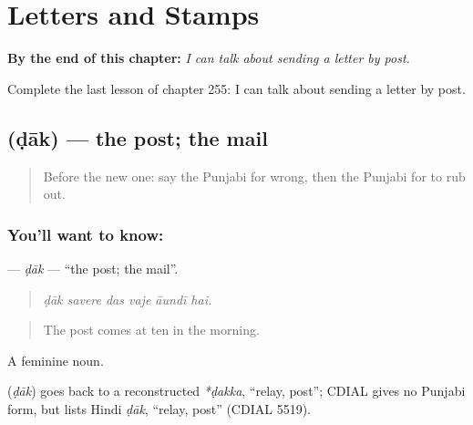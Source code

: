 
\chapter{Letters and Stamps}
\label{ch:pa-a2-letters-and-stamps}

\begin{chapteropening}
\textbf{By the end of this chapter:} \emph{I can talk about sending a letter by post.}

Complete the last lesson of chapter 255: I can talk about sending a letter by post.
\end{chapteropening}

\section[\texorpdfstring{\pa{ਡਾਕ} (ḍāk)}{ਡਾਕ (ḍāk)}]{ (ḍāk) — the post; the mail}

\label{lesson:PA-C255-dak}



\begin{quote}
Before the new one: say the Punjabi for wrong, then the Punjabi for to rub out.
\end{quote}

\subsection*{You'll want to know: }
\textbf{} — \emph{ḍāk} — \textquotedblleft{}the post; the mail\textquotedblright{}.

\begin{quote}
     
\end{quote}

\begin{quote}
\emph{ḍāk savere das vaje āundī hai.}
\end{quote}

\begin{quote}
The post comes at ten in the morning.
\end{quote}

A feminine noun.

\begin{cousinweb}
\textbf{} (\emph{ḍāk}) goes back to a reconstructed \emph{*ḍakka}, \textquotedblleft{}relay, post\textquotedblright{}; CDIAL gives no Punjabi form, but lists Hindi \emph{ḍāk}, \textquotedblleft{}relay, post\textquotedblright{} (CDIAL 5519).
\end{cousinweb}

